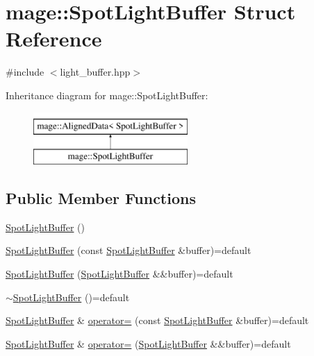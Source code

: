 \hypertarget{structmage_1_1_spot_light_buffer}{}\section{mage\+:\+:Spot\+Light\+Buffer Struct Reference}
\label{structmage_1_1_spot_light_buffer}


{\ttfamily \#include $<$light\+\_\+buffer.\+hpp$>$}

Inheritance diagram for mage\+:\+:Spot\+Light\+Buffer\+:\begin{figure}[H]
\begin{center}
\leavevmode
\includegraphics[height=2.000000cm]{structmage_1_1_spot_light_buffer}
\end{center}
\end{figure}
\subsection*{Public Member Functions}
\begin{DoxyCompactItemize}
\item 
\hyperlink{structmage_1_1_spot_light_buffer_a862141be0a9dfe1fd3117141924650d5}{Spot\+Light\+Buffer} ()
\item 
\hyperlink{structmage_1_1_spot_light_buffer_a572e805bf8eef2a1183162ae68877ade}{Spot\+Light\+Buffer} (const \hyperlink{structmage_1_1_spot_light_buffer}{Spot\+Light\+Buffer} \&buffer)=default
\item 
\hyperlink{structmage_1_1_spot_light_buffer_a0dd63c65417578b6001b1c7f2195452c}{Spot\+Light\+Buffer} (\hyperlink{structmage_1_1_spot_light_buffer}{Spot\+Light\+Buffer} \&\&buffer)=default
\item 
\hyperlink{structmage_1_1_spot_light_buffer_aabbc92532299057fb4d649b1a9bcc605}{$\sim$\+Spot\+Light\+Buffer} ()=default
\item 
\hyperlink{structmage_1_1_spot_light_buffer}{Spot\+Light\+Buffer} \& \hyperlink{structmage_1_1_spot_light_buffer_ac2655ea3a51554f3c1b5e71afbc737b2}{operator=} (const \hyperlink{structmage_1_1_spot_light_buffer}{Spot\+Light\+Buffer} \&buffer)=default
\item 
\hyperlink{structmage_1_1_spot_light_buffer}{Spot\+Light\+Buffer} \& \hyperlink{structmage_1_1_spot_light_buffer_abbc27ec6784066dae03ee9f68c71ffea}{operator=} (\hyperlink{structmage_1_1_spot_light_buffer}{Spot\+Light\+Buffer} \&\&buffer)=default
\end{DoxyCompactItemize}
